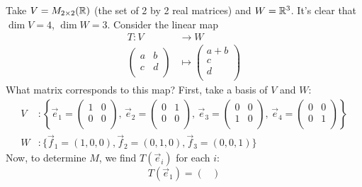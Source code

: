 \documentclass{../template/note}
\begin{document}
    \begin{example}
        Take \(V = M_{2 \times 2}(\mathbb R)\) (the set of 2 by 2 real matrices) and \(W = \mathbb R^3\). It's clear that \(\dim V = 4\), \(\dim W = 3\). Consider the linear map
        \begin{align*}
            T: V &\to W \\
            \begin{pmatrix}
             a & b \\
             c & d \\
            \end{pmatrix} &\mapsto
            \begin{pmatrix}
             a+b \\
             c \\
             d \\
            \end{pmatrix}
        \end{align*}
        What matrix corresponds to this map? First, take a basis of \(V\) and \(W\):
        \begin{align*}
            V&: \left\{\vec e_1 = \begin{pmatrix}
             1 & 0 \\
             0 & 0 \\
            \end{pmatrix},\,
            \vec e_2 = \begin{pmatrix}
             0 & 1 \\
             0 & 0 \\
            \end{pmatrix},\,
            \vec e_3 = \begin{pmatrix}
             0 & 0 \\
             1 & 0 \\
            \end{pmatrix},\,
            \vec e_4 = \begin{pmatrix}
             0 & 0 \\
             0 & 1 \\
            \end{pmatrix}\right\} \\
            W&: \{\vec f_1 = (1, 0, 0), \vec f_2 = (0, 1, 0), \vec f_3 = (0, 0, 1)\}
        \end{align*}
        Now, to determine \(M\), we find \(T(\vec e_i)\) for each \(i\):
        \[
            T(\vec e_1) = \begin{pmatrix}

\end{pmatrix}\]
\end{example}
\end{document}

